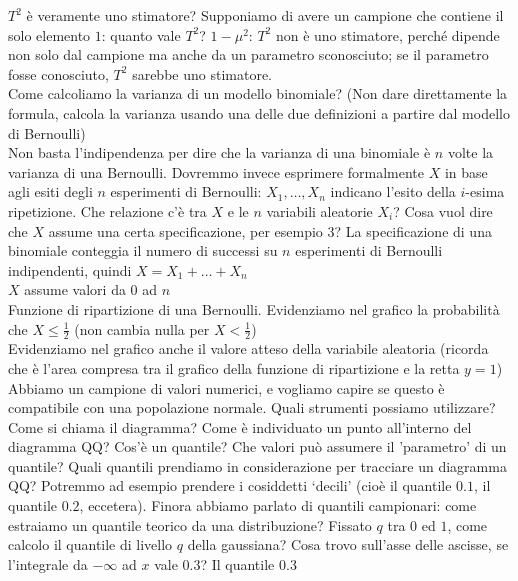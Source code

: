 \documentclass{article}
\begin{document}
    $ T^2 $ è veramente uno stimatore? Supponiamo di avere un campione che contiene il solo elemento $ 1 $: quanto vale $ T^2 $? $ 1 - \mu^2 $: $ T^2 $ non è uno stimatore, perché
    dipende non solo dal campione ma anche da un parametro sconosciuto; se il parametro fosse conosciuto, $ T^2 $ sarebbe uno stimatore. \\
    Come calcoliamo la varianza di un modello binomiale? (Non dare direttamente la formula, calcola la varianza usando una delle due definizioni a partire dal modello di Bernoulli) \\
    Non basta l'indipendenza per dire che la varianza di una binomiale è $ n $ volte la varianza di una Bernoulli. Dovremmo invece esprimere formalmente $ X $ in base agli esiti degli
    $ n $ esperimenti di Bernoulli: $ X_1, \dots, X_n $ indicano l'esito della $ i $-esima ripetizione. Che relazione c'è tra $ X $ e le $ n $ variabili aleatorie $ X_i $? Cosa
    vuol dire che $ X $ assume una certa specificazione, per esempio $ 3 $? La specificazione di una binomiale conteggia il numero di successi su $ n $ esperimenti di Bernoulli
    indipendenti, quindi $ X = X_1 + \dots + X_n $ \\
    $ X $ assume valori da $ 0 $ ad $ n $ \\
    Funzione di ripartizione di una Bernoulli. Evidenziamo nel grafico la probabilità che $ X \leq \frac{ 1 }{ 2 } $ (non cambia nulla per $ X < \frac{ 1 }{ 2 } $) \\
    Evidenziamo nel grafico anche il valore atteso della variabile aleatoria (ricorda che è l'area compresa tra il grafico della funzione di ripartizione e la retta $ y = 1 $) \\
    Abbiamo un campione di valori numerici, e vogliamo capire se questo è compatibile con una popolazione normale. Quali strumenti possiamo utilizzare? Come si chiama il 
    diagramma? Come è individuato un punto all'interno del diagramma QQ? Cos'è un quantile? Che valori può assumere il 'parametro' di un quantile? Quali quantili prendiamo in
    considerazione per tracciare un diagramma QQ? Potremmo ad esempio prendere i cosiddetti ‘decili’ (cioè il quantile $ 0.1 $, il quantile $ 0.2 $, eccetera). Finora abbiamo
    parlato di quantili campionari: come estraiamo un quantile teorico da una distribuzione? Fissato $ q $ tra $ 0 $ ed $ 1 $, come calcolo il quantile di livello $ q $ della
    gaussiana? Cosa trovo sull'asse delle ascisse, se l'integrale da $ - \infty $ ad $ x $ vale $ 0.3 $? Il quantile $ 0.3 $
    
\end{document}
